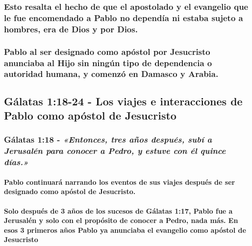 \documentclass[11a pt,twoside]{article}
\newcommand{\scripture}[1]{%
  {\fontsize{12pt}{16pt}\selectfont\ScriptureFont\itshape #1}%
}
\let\oldsubsection\subsection
\renewcommand{\subsection}{\needspace{5\baselineskip}\oldsubsection}
\let\oldsubsubsection\subsubsection
\renewcommand{\subsubsection}{\needspace{4\baselineskip}\oldsubsubsection}
\let\oldparagraph\paragraph
\renewcommand{\paragraph}{\needspace{3\baselineskip}\oldparagraph}
\begin{document}
\subsubsection{Esto resalta el hecho de que el apostolado y el evangelio
que le fue encomendado a Pablo no dependía ni estaba sujeto a hombres,
era de Dios y por
Dios.}\label{esto-resalta-el-hecho-de-que-el-apostolado-y-el-evangelio-que-le-fue-encomendado-a-pablo-no-dependuxeda-ni-estaba-sujeto-a-hombres-era-de-dios-y-por-dios.}

\subsubsection{Pablo al ser designado como apóstol por Jesucristo
anunciaba al Hijo sin ningún tipo de dependencia o autoridad humana, y
comenzó en Damasco y
Arabia.}\label{pablo-al-ser-designado-como-apuxf3stol-por-jesucristo-anunciaba-al-hijo-sin-ninguxfan-tipo-de-dependencia-o-autoridad-humana-y-comenzuxf3-en-damasco-y-arabia.}

\subsection{Gálatas 1:18-24 - Los viajes e interacciones de Pablo como
apóstol de
Jesucristo}\label{guxe1latas-118-24---los-viajes-e-interacciones-de-pablo-como-apuxf3stol-de-jesucristo}

\subsubsection{\texorpdfstring{Gálatas 1:18 -
\scripture{«Entonces, tres años después, subí a Jerusalén para conocer a Pedro, y estuve con él quince días.»}}{Gálatas 1:18 - }}\label{guxe1latas-118---entonces-tres-auxf1os-despuuxe9s-subuxed-a-jerusaluxe9n-para-conocer-a-pedro-y-estuve-con-uxe9l-quince-duxedas.}

\paragraph{Pablo continuará narrando los eventos de sus viajes después
de ser designado como apóstol de
Jesucristo.}\label{pablo-continuaruxe1-narrando-los-eventos-de-sus-viajes-despuuxe9s-de-ser-designado-como-apuxf3stol-de-jesucristo.}

\paragraph{Solo después de 3 años de los sucesos de Gálatas 1:17, Pablo
fue a Jerusalén y solo con el propósito de conocer a Pedro, nada más. En
esos 3 primeros años Pablo ya anunciaba el evangelio como apóstol de
Jesucristo}\label{solo-despuuxe9s-de-3-auxf1os-de-los-sucesos-de-guxe1latas-117-pablo-fue-a-jerusaluxe9n-y-solo-con-el-propuxf3sito-de-conocer-a-pedro-nada-muxe1s.-en-esos-3-primeros-auxf1os-pablo-ya-anunciaba-el-evangelio-como-apuxf3stol-de-jesucristo}
\end{document}
